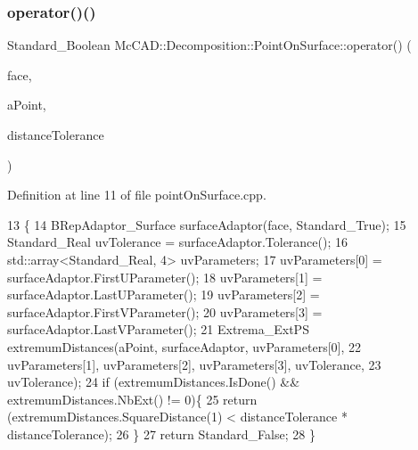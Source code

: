 \subsubsection{\texorpdfstring{operator()()}{operator()()}\hspace{0.1cm}{\footnotesize\ttfamily [1/2]}}
{\footnotesize\ttfamily Standard\+\_\+\+Boolean Mc\+C\+A\+D\+::\+Decomposition\+::\+Point\+On\+Surface\+::operator() (\begin{DoxyParamCaption}\item[{const Topo\+D\+S\+\_\+\+Face \&}]{face,  }\item[{const gp\+\_\+\+Pnt \&}]{a\+Point,  }\item[{const Standard\+\_\+\+Real \&}]{distance\+Tolerance }\end{DoxyParamCaption})}



Definition at line 11 of file point\+On\+Surface.\+cpp.


\begin{DoxyCode}
13                                                \{
14     BRepAdaptor\_Surface surfaceAdaptor(face, Standard\_True);
15     Standard\_Real uvTolerance = surfaceAdaptor.Tolerance();
16     std::array<Standard\_Real, 4> uvParameters;
17     uvParameters[0] = surfaceAdaptor.FirstUParameter();
18     uvParameters[1] = surfaceAdaptor.LastUParameter();
19     uvParameters[2] = surfaceAdaptor.FirstVParameter();
20     uvParameters[3] = surfaceAdaptor.LastVParameter();
21     Extrema\_ExtPS extremumDistances(aPoint, surfaceAdaptor, uvParameters[0],
22             uvParameters[1], uvParameters[2], uvParameters[3], uvTolerance,
23             uvTolerance);
24     \textcolor{keywordflow}{if} (extremumDistances.IsDone() && extremumDistances.NbExt() != 0)\{
25         \textcolor{keywordflow}{return} (extremumDistances.SquareDistance(1) < distanceTolerance * distanceTolerance);
26     \}
27     \textcolor{keywordflow}{return} Standard\_False;
28 \}
\end{DoxyCode}
\mbox{\label{classMcCAD_1_1Decomposition_1_1PointOnSurface_a3d8a322860c33299b6c0f3e64b16ee85}} 
